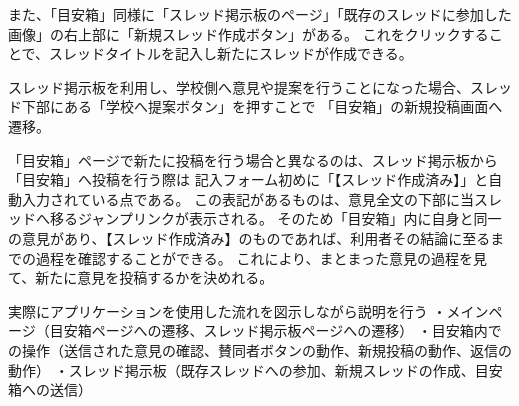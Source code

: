 \documentclass[main]{subfiles}
\begin{document}
また、「目安箱」同様に「スレッド掲示板のページ」「既存のスレッドに参加した画像」の右上部に「新規スレッド作成ボタン」がある。
これをクリックすることで、スレッドタイトルを記入し新たにスレッドが作成できる。

スレッド掲示板を利用し、学校側へ意見や提案を行うことになった場合、スレッド下部にある「学校へ提案ボタン」を押すことで
「目安箱」の新規投稿画面へ遷移。

「目安箱」ページで新たに投稿を行う場合と異なるのは、スレッド掲示板から「目安箱」へ投稿を行う際は
記入フォーム初めに「【スレッド作成済み】」と自動入力されている点である。
この表記があるものは、意見全文の下部に当スレッドへ移るジャンプリンクが表示される。
そのため「目安箱」内に自身と同一の意見があり、【スレッド作成済み】のものであれば、利用者その結論に至るまでの過程を確認することができる。
これにより、まとまった意見の過程を見て、新たに意見を投稿するかを決めれる。



実際にアプリケーションを使用した流れを図示しながら説明を行う
・メインページ（目安箱ページへの遷移、スレッド掲示板ページへの遷移）
・目安箱内での操作（送信された意見の確認、賛同者ボタンの動作、新規投稿の動作、返信の動作）
・スレッド掲示板（既存スレッドへの参加、新規スレッドの作成、目安箱への送信）
\end{document}

